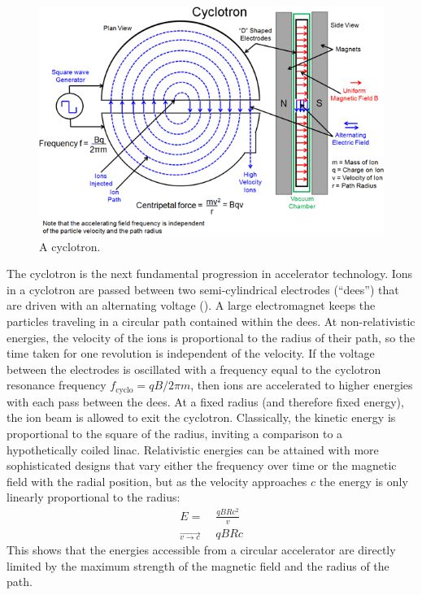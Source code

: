 \begin{figure}[t]
  \includegraphics[width=0.8\linewidth]{cyclotron.png}
  \caption{A cyclotron.}
  \label{fig:cyclotron}
\end{figure}
The cyclotron is the next fundamental progression in accelerator technology.
Ions in a cyclotron are passed between two semi-cylindrical electrodes (``dees'') that are driven with an alternating voltage (\Fig{\ref{fig:cyclotron}}).
A large electromagnet keeps the particles traveling in a circular path contained within the dees.
At non-relativistic energies, the velocity of the ions is proportional to the radius of their path, so the time taken for one revolution is independent of the velocity.
If the voltage between the electrodes is oscillated with a frequency equal to the cyclotron resonance frequency $f_\textrm{cyclo} = q B / 2\pi m$, then ions are accelerated to higher energies with each pass between the dees.
At a fixed radius (and therefore fixed energy), the ion beam is allowed to exit the cyclotron.
Classically, the kinetic energy is proportional to the square of the radius, inviting a comparison to a hypothetically coiled linac.
Relativistic energies can be attained with more sophisticated designs that vary either the frequency over time or the magnetic field with the radial position, but as the velocity approaches $c$ the energy is only linearly proportional to the radius:
\begin{align}
\label{eqn:gyroradius}
E =& \; \frac{q B R c^2}{v}\\
\overrightarrow{{}_{v \rightarrow c}}& \; q B R c
\end{align}
This shows that the energies accessible from a circular accelerator are directly limited by the maximum strength of the magnetic field and the radius of the path.

